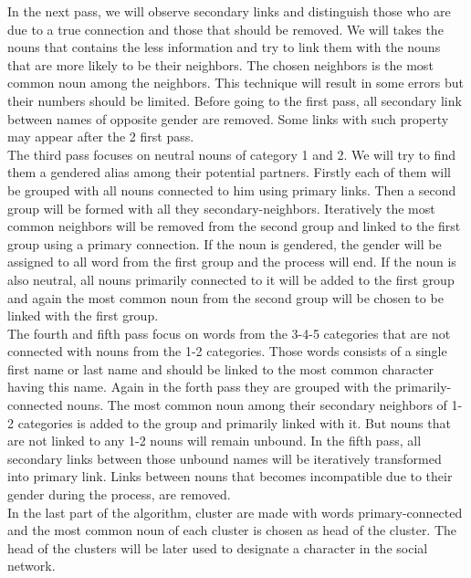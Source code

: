 \documentclass[a4paper, 12pt]{report}
\begin{document}
In the next pass, we will observe secondary links and distinguish those who are due to a true connection and those that should be removed. We will takes the nouns that contains the less information and try to link them with the nouns that are more likely to be their neighbors. The chosen neighbors is the most common noun among the neighbors. This technique will result in some errors but their numbers should be limited. Before going to the first pass, all secondary link between names of opposite gender are removed. Some links with such property may appear after the 2 first pass.\\

The third pass focuses on neutral nouns of category 1 and 2. We will try to find them a gendered alias among their potential partners. Firstly each of them will be grouped with all nouns connected to him using  primary links. Then a second group will be formed with all they secondary-neighbors. Iteratively the most common neighbors  will be removed from the second group and linked to the first group using a  primary  connection. If the noun is gendered, the gender will be assigned to all word from the first group and the process will end. If the noun is also neutral, all nouns  primarily connected to it will be added to the first group and again the most common noun from the second group will be chosen to be linked with the first group.\\

The fourth and fifth pass focus on words from the 3-4-5 categories that are not connected with nouns from the 1-2 categories. Those words consists of a single first name or last name and should be linked to the most common character having this name. Again in the forth pass they are grouped with the primarily-connected nouns. The most common noun among their secondary neighbors of 1-2 categories is added to the group and  primarily linked with it. But nouns that are not linked to any 1-2 nouns will remain unbound. In the fifth pass, all secondary links between those unbound   names will be iteratively transformed into primary link. Links between nouns that becomes incompatible due to their gender during the process, are removed.\\

In the last part of the algorithm, cluster are made with words primary-connected and the most common noun of each cluster is chosen as head of the cluster. The head of the clusters will be later used to designate a character in the social network.
\end{document}
